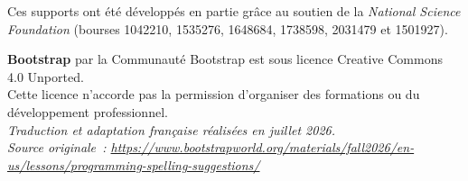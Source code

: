 \documentclass[12pt,a4paper]{article}
\begin{document}
Ces supports ont été développés en partie grâce au soutien de la \emph{National Science Foundation} (bourses 1042210, 1535276, 1648684, 1738598, 2031479 et 1501927).

\begin{center}
  \textbf{Bootstrap} par la Communauté Bootstrap est sous licence Creative Commons 4.0 Unported.\\
  Cette licence n'accorde pas la permission d'organiser des formations ou du développement professionnel.\\[1em]
  \textit{Traduction et adaptation française réalisées en juillet 2026.}\\
  \textit{Source originale~: \url{https://www.bootstrapworld.org/materials/fall2026/en-us/lessons/programming-spelling-suggestions/}}
\end{center}
\end{document}
